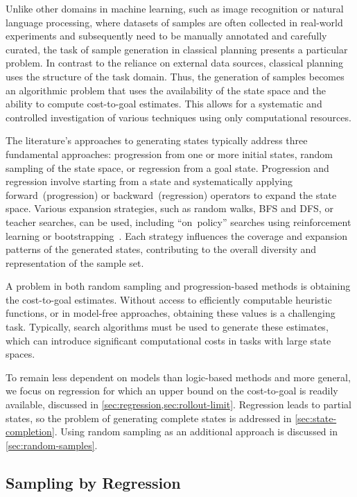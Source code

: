 Unlike other domains in machine learning, such as image recognition or natural language processing, where datasets of samples are often collected in real-world experiments and subsequently need to be manually annotated and carefully curated, the task of sample generation in classical planning presents a particular problem. In contrast to the reliance on external data sources, classical planning uses the structure of the task domain. Thus, the generation of samples becomes an algorithmic problem that uses the availability of the state space and the ability to compute cost-to-goal estimates. This allows for a systematic and controlled investigation of various techniques using only computational resources.

The literature's approaches to generating states typically address three fundamental approaches: progression from one or more initial states, random sampling of the state space, or regression from a goal state. Progression and regression involve starting from a state and systematically applying forward~(progression) or backward~(regression) operators to expand the state space. Various expansion strategies, such as random walks, BFS and DFS, or teacher searches, can be used, including ``on~policy'' searches using reinforcement learning or bootstrapping~\cite{arfaee2011learning}. Each strategy influences the coverage and expansion patterns of the generated states, contributing to the overall diversity and representation of the sample set.

A problem in both random sampling and progression-based methods is obtaining the cost-to-goal estimates. Without access to efficiently computable heuristic functions, or in model-free approaches, obtaining these values is a challenging task. Typically, search algorithms must be used to generate these estimates, which can introduce significant computational costs in tasks with large state spaces.

To remain less dependent on models than logic-based methods and more general, we focus on regression for which an upper bound on the cost-to-goal is readily available, discussed in \cref{sec:regression,sec:rollout-limit}. Regression leads to partial states, so the problem of generating complete states is addressed in \cref{sec:state-completion}. Using random sampling as an additional approach is discussed in \cref{sec:random-samples}.

\subsection{Sampling by Regression}
\label{sec:regression}

